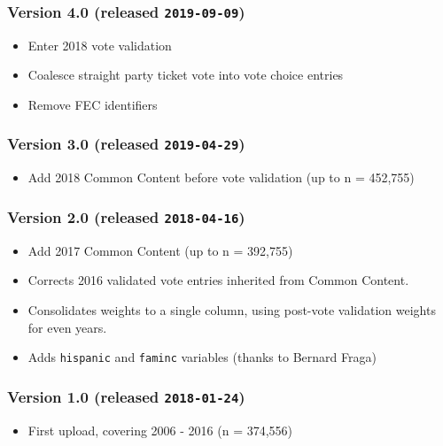 \documentclass[10pt,article,oneside]{memoir}
\begin{document}
\subsubsection{\texorpdfstring{Version 4.0 (released
\texttt{2019-09-09})}{Version 4.0 (released 2019-09-09)}}\label{version-4.0-released-2019-09-09}

\begin{itemize}
\tightlist
\item
  Enter 2018 vote validation
\item
  Coalesce straight party ticket vote into vote choice entries
\item
  Remove FEC identifiers
\end{itemize}

\subsubsection{\texorpdfstring{Version 3.0 (released
\texttt{2019-04-29})}{Version 3.0 (released 2019-04-29)}}\label{version-3.0-released-2019-04-29}

\begin{itemize}
\tightlist
\item
  Add 2018 Common Content before vote validation (up to n = 452,755)
\end{itemize}

\subsubsection{\texorpdfstring{Version 2.0 (released
\texttt{2018-04-16})}{Version 2.0 (released 2018-04-16)}}\label{version-2.0-released-2018-04-16}

\begin{itemize}
\tightlist
\item
  Add 2017 Common Content (up to n = 392,755)
\item
  Corrects 2016 validated vote entries inherited from Common Content.
\item
  Consolidates weights to a single column, using post-vote validation
  weights for even years.
\item
  Adds \texttt{hispanic} and \texttt{faminc} variables (thanks to
  Bernard Fraga)
\end{itemize}

\subsubsection{\texorpdfstring{Version 1.0 (released
\texttt{2018-01-24})}{Version 1.0 (released 2018-01-24)}}\label{version-1.0-released-2018-01-24}

\begin{itemize}
\tightlist
\item
  First upload, covering 2006 - 2016 (n = 374,556)
\end{itemize}
\end{document}
